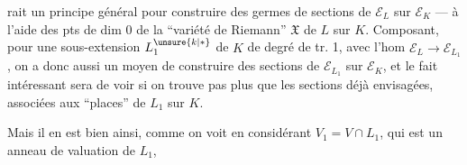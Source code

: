 rait un principe général pour construire des germes de sections de $\mathcal E_L$ sur $\mathcal E_K$ --- à l'aide des pts de dim 0 de la ``variété de Riemann'' $\mathfrak X$ de $L$ sur $K$. Composant, pour une sous-extension $L_1^{\unsure{k|*}}$ de $K$ de degré de tr. 1, avec l'hom $\mathcal E_L\longrightarrow\mathcal E_{L_1}$, on a donc aussi un moyen de construire des  sections de $\mathcal E_{L_1}$ sur $\mathcal E_K$, et le fait intéressant sera de voir si on  trouve pas plus que les sections déjà envisagées, associées aux ``places'' de $L_1$ sur $K$.

Mais il en est bien ainsi, comme on voit en considérant $V_1=V\cap L_1$, qui est un anneau de valuation de $L_1$,
